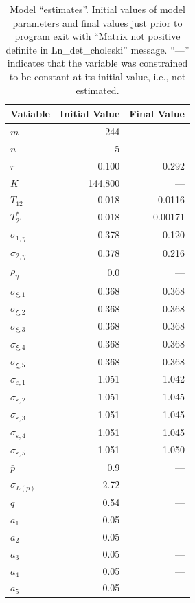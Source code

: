 \documentclass[12pt,letterpaper]{article}
\begin{document}
\begin{table}
\caption{\label{tab:testrun}
Model ``estimates''. Initial values of model parameters and
final values just prior to program exit with 
``Matrix not positive definite in Ln\_det\_choleski'' message.
``---'' indicates that the variable was constrained to be constant at
its initial value, i.e., not estimated.
}
\begin{center}
\begin{tabular}{lrr}
\hline
Vatiable & Initial Value & Final Value\\
\hline
$m$ &  244\\
$n$ &  5\\
\hline
$r$ & 0.100 &  0.292\\
$K$ & 144,800 & --- \\
$T_{12}$ & 0.018 & 0.0116\\
$T^*_{21}$& 0.018 & 0.00171\\
\hline
$\sigma_{1,\eta}$ & 0.378 & 0.120\\
$\sigma_{2,\eta}$ & 0.378 & 0.216\\
$\rho_\eta$ & 0.0 & --- \\
\hline
$\sigma_{\xi,1}$ & 0.368 & 0.368\\
$\sigma_{\xi,2}$ & 0.368 & 0.368\\
$\sigma_{\xi,3}$ & 0.368 & 0.368\\
$\sigma_{\xi,4}$ & 0.368 & 0.368\\
$\sigma_{\xi,5}$ & 0.368 & 0.368\\
\hline
$\sigma_{\varepsilon,1}$ & 1.051 & 1.042\\
$\sigma_{\varepsilon,2}$ & 1.051 & 1.045\\
$\sigma_{\varepsilon,3}$ & 1.051 & 1.045\\
$\sigma_{\varepsilon,4}$ & 1.051 & 1.045\\
$\sigma_{\varepsilon,5}$ & 1.051 & 1.050\\
\hline
$\bar{p}$ & 0.9 & ---\\
$\sigma_{L(p)}$ & 2.72 & ---\\
$q$ & 0.54 & ---\\
$a_1$ & 0.05 & ---\\
$a_2$ & 0.05 & ---\\
$a_3$ & 0.05 & ---\\
$a_4$ & 0.05 & ---\\
$a_5$ & 0.05 & ---\\
\hline
\end{tabular}
\end{center}
\end{table}
\end{document}
